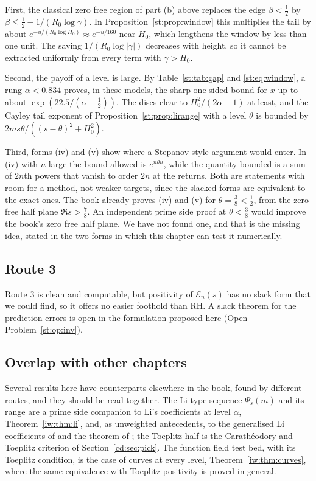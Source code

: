 First, the classical zero free region of part (b) above replaces the edge $\beta<\tfrac12$ by $\beta\le\tfrac12-1/(R_0\log\gamma)$. In Proposition~\ref{st:prop:window} this multiplies the tail by about $e^{-u/(R_0\log H_0)}\approx e^{-u/160}$ near $H_0$, which lengthens the window by less than one unit. The saving $1/(R_0\log|\gamma|)$ decreases with height, so it cannot be extracted uniformly from every term with $\gamma>H_0$.

Second, the payoff of a level is large. By Table~\ref{st:tab:gap} and \eqref{st:eq:window}, a rung $\alpha<0.834$ proves, in these models, the sharp one sided bound for $x$ up to about $\exp(22.5/(\alpha-\tfrac12))$. The discs clear to $H_0^2/(2\alpha-1)$ at least, and the Cayley tail exponent of Proposition~\ref{st:prop:lirange} with a level $\theta$ is bounded by $2ms\theta/((s-\theta)^2+H_0^2)$.

Third, forms (iv) and (v) show where a Stepanov style argument would enter. In (iv) with $n$ large the bound allowed is $e^{n\theta u}$, while the quantity bounded is a sum of $2n$th powers that vanish to order $2n$ at the returns. Both are statements with room for a method, not weaker targets, since the slacked forms are equivalent to the exact ones. The book already proves (iv) and (v) for $\theta=\tfrac38<\tfrac12$, from the zero free half plane $\Re s>\tfrac78$. An independent prime side proof at $\theta<\tfrac38$ would improve the book's zero free half plane. We have not found one, and that is the missing idea, stated in the two forms in which this chapter can test it numerically.

\subsection{Route 3}
Route 3 is clean and computable, but positivity of $\mathcal E_n(s)$ has no slack form that we could find, so it offers no easier foothold than RH. A slack theorem for the prediction errors is open in the formulation proposed here (Open Problem~\ref{st:op:inv}).

\subsection{Overlap with other chapters}
Several results here have counterparts elsewhere in the book, found by different routes, and they should be read together. The Li type sequence $\Psi_s(m)$ and its range are a prime side companion to Li's coefficients at level $\alpha$, Theorem~\ref{iw:thm:li}, and, as unweighted antecedents, to the generalised Li coefficients of \cite{Sekatskii14} and the theorem of \cite{BL99}; the Toeplitz half is the Carath\'eodory and Toeplitz criterion of Section~\ref{cd:sec:pick}. The function field test bed, with its Toeplitz condition, is the case of curves at every level, Theorem~\ref{iw:thm:curves}, where the same equivalence with Toeplitz positivity is proved in general.


